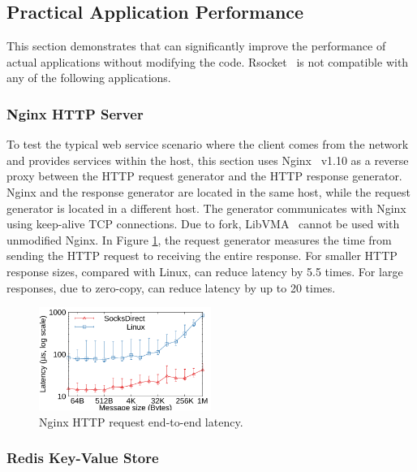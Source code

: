 \subsection{Practical Application Performance}
\label{socksdirect:subsec:application}

This section demonstrates that \sys {} can significantly improve the performance of actual applications without modifying the code.
Rsocket~ \cite {rsockets} is not compatible with any of the following applications.

\subsubsection{Nginx HTTP Server}

To test the typical web service scenario where the client comes from the network and provides services within the host, this section uses Nginx~ \cite {nginx} v1.10 as a reverse proxy between the HTTP request generator and the HTTP response generator.
Nginx and the response generator are located in the same host, while the request generator is located in a different host.
The generator communicates with Nginx using keep-alive TCP connections.
Due to fork, LibVMA~ \cite {libvma} cannot be used with unmodified Nginx.
In Figure \ref {socksdirect:fig:eval-nginx}, the request generator measures the time from sending the HTTP request to receiving the entire response.
For smaller HTTP response sizes, compared with Linux, \sys {} can reduce latency by 5.5 times.
For large responses, due to zero-copy, \sys {} can reduce latency by up to 20 times.

\begin{figure}[htbp]
	\centering \includegraphics[width=0.5\textwidth]{eval/web/msgsize-clocal-lat.pdf}
	
	\caption{Nginx HTTP request end-to-end latency.}
	\label{socksdirect:fig:eval-nginx}
\end{figure}

\subsubsection{Redis Key-Value Store}

